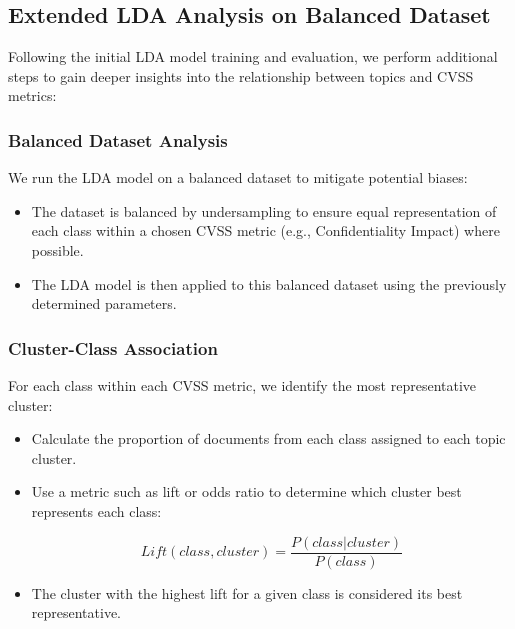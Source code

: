 \documentclass[12pt]{article}
\begin{document}
\subsection{Extended LDA Analysis on Balanced Dataset}

Following the initial LDA model training and evaluation, we perform additional steps to gain deeper insights into the relationship between topics and CVSS metrics:

\subsubsection{Balanced Dataset Analysis}

We run the LDA model on a balanced dataset to mitigate potential biases:

\begin{itemize}

	\item The dataset is balanced by undersampling to ensure equal representation of each class
	      within a chosen CVSS metric (e.g., Confidentiality Impact) where possible.

	\item The LDA model is then applied to this balanced dataset using the previously determined parameters.

\end{itemize}

\subsubsection{Cluster-Class Association}

For each class within each CVSS metric, we identify the most representative cluster:

\begin{itemize}

	\item Calculate the proportion of documents from each class assigned to each topic cluster.

	\item Use a metric such as lift or odds ratio to determine which cluster best represents each class:

	      \begin{equation}
		      Lift(class, cluster) = \frac{P(class | cluster)}{P(class)}
	      \end{equation}

	\item The cluster with the highest lift for a given class is considered its best representative.

\end{itemize}
\end{document}
